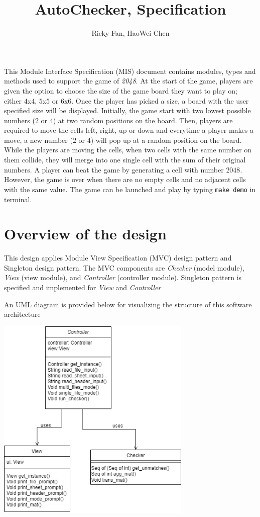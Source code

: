 \documentclass[12pt]{article}
\title{AutoChecker, Specification}
\author{Ricky Fan, HaoWei Chen}
\begin{document}
\maketitle
This Module Interface Specification (MIS) document contains modules, types and
methods used to support the game of \textit{2048}. At the start of the game, 
players are given the option to choose the size of the game board they want to 
play on; either $4$x$4$, $5$x$5$ or $6$x$6$. Once the player has picked a size, 
a board with the user specified size will be displayed. Initially, the game start 
with two lowest possible numbers ($2$ or $4$) at two random positions on the 
board. Then, players are required to move the cells left, right, up or down and 
everytime a player makes a move, a new number ($2$ or $4$) will pop up at a random 
position on the board. While the players are moving the cells, when two cells with 
the same number on them collide, they will merge into one single cell with the sum 
of their original numbers. A player can beat the game by generating a cell with 
number $2048$. However, the game is over when there are no empty cells and no 
adjacent cells with the same value. The game can be launched and play by typing 
\texttt{make demo} in terminal.

\newpage

\section{Overview of the design}

This design applies Module View Specification (MVC) design pattern and 
Singleton design pattern. The MVC components are \textit{Checker} (model module), 
\textit{View} (view module), and \textit{Controller} (controller module). Singleton pattern is 
specified and implemented for \textit{View} and \textit{Controller} 

\bigskip

\noindent An UML diagram is provided below for visualizing the structure of this software architecture

\begin{center}
  \includegraphics[width=0.7\textwidth]{UML_AutoChecker.png}
\end{center}
\end{document}
